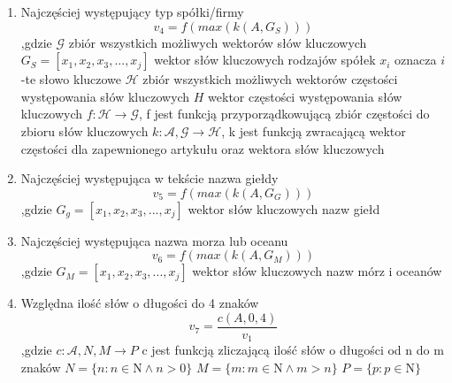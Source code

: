 \documentclass{classrep}
\begin{document}
\begin{enumerate}
\item Najczęściej występujący typ spółki/firmy
\begin{equation}
v_{4}=f(max(k(A,G_S))) \label{eq:eps}
\end{equation}
,gdzie
\newline $\mathcal{G}$ zbiór wszystkich możliwych wektorów słów kluczowych
\newline $G_S = [x_1,x_2,x_3,. . . , x_j]$ wektor słów kluczowych rodzajów spółek
\newline $x_i$ oznacza $i$-te słowo kluczowe
\newline $\mathcal{H}$ zbiór wszystkich możliwych wektorów częstości występowania słów kluczowych
\newline $H$ wektor częstości występowania słów kluczowych
\newline $f:\mathcal{H} \rightarrow \mathcal{G}$, f jest funkcją przyporządkowującą zbiór częstości do zbioru słów kluczowych
\newline $k:\mathcal{A},\mathcal{G}\rightarrow\mathcal{H}$, k jest funkcją zwracającą wektor częstości dla zapewnionego artykułu oraz wektora słów kluczowych

\item Najczęściej występująca w tekście nazwa giełdy
\begin{equation}
v_{5}=f(max(k(A,G_G))) \label{eq:eps}
\end{equation}
,gdzie
\newline $G_g = [x_1,x_2,x_3,. . . , x_j]$ wektor słów kluczowych nazw giełd

\item Najczęściej występująca nazwa morza lub oceanu
\begin{equation}
v_{6}={f(max(k(A,G_M)))}\label{eq:eps}
\end{equation}
,gdzie
\newline $G_M = [x_1,x_2,x_3,. . . , x_j]$ wektor słów kluczowych nazw mórz i oceanów


\item Względna ilość słów o długości do 4 znaków
\begin{equation}
v_{7}=\frac{c(A,0,4)}{v_1}\label{eq:eps}
\end{equation}
,gdzie
\newline $c:\mathcal{A},N,M\rightarrow P$ c jest funkcją zliczającą ilość słów o długości od n do m znaków
\newline $N = \{n:n\in\mathrm{N} \land n>0\}$
\newline $M = \{m:m\in\mathrm{N} \land m>n\}$
\newline $P = \{p:p\in\mathrm{N}\}$


\end{enumerate}
\end{document}
